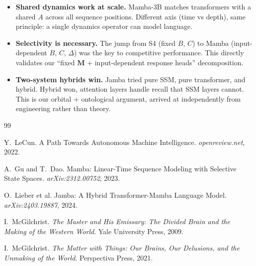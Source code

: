 \documentclass[11pt, a4paper]{article}
\newcommand{\M}{\mathbf{M}}
\theoremstyle{remark}
\begin{document}
\begin{itemize}[nosep]
    \item \textbf{Shared dynamics work at scale.} Mamba-3B matches transformers with a shared $A$ across all sequence positions. Different axis (time vs depth), same principle: a single dynamics operator can model language.
    \item \textbf{Selectivity is necessary.} The jump from S4 (fixed $B$, $C$) to Mamba (input-dependent $B$, $C$, $\Delta$) was the key to competitive performance. This directly validates our ``fixed $\M$ + input-dependent response heads'' decomposition.
    \item \textbf{Two-system hybrids win.} Jamba tried pure SSM, pure transformer, and hybrid. Hybrid won, attention layers handle recall that SSM layers cannot. This is our orbital + ontological argument, arrived at independently from engineering rather than theory.
\end{itemize}

\bigskip
\begin{thebibliography}{99}

Y.~LeCun.
\newblock A Path Towards Autonomous Machine Intelligence.
\newblock \emph{openreview.net}, 2022.

A.~Gu and T.~Dao.
\newblock Mamba: Linear-Time Sequence Modeling with Selective State Spaces.
\newblock \emph{arXiv:2312.00752}, 2023.

O.~Lieber et al.
\newblock Jamba: A Hybrid Transformer-Mamba Language Model.
\newblock \emph{arXiv:2403.19887}, 2024.

I.~McGilchrist. \emph{The Master and His Emissary: The Divided Brain and the Making of the Western World}. Yale University Press, 2009.

I.~McGilchrist. \emph{The Matter with Things: Our Brains, Our Delusions, and the Unmaking of the World}. Perspectiva Press, 2021.
\end{thebibliography}
\end{document}
